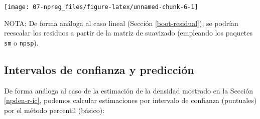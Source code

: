 \documentclass[
]{book}
\newenvironment{Shaded}{\begin{snugshade}}{\end{snugshade}}
\newcommand{\AttributeTok}[1]{\textcolor[rgb]{0.77,0.63,0.00}{#1}}
\newcommand{\DecValTok}[1]{\textcolor[rgb]{0.00,0.00,0.81}{#1}}
\newcommand{\FloatTok}[1]{\textcolor[rgb]{0.00,0.00,0.81}{#1}}
\newcommand{\FunctionTok}[1]{\textcolor[rgb]{0.00,0.00,0.00}{#1}}
\newcommand{\NormalTok}[1]{#1}
\newcommand{\OtherTok}[1]{\textcolor[rgb]{0.56,0.35,0.01}{#1}}
\newcommand{\SpecialCharTok}[1]{\textcolor[rgb]{0.00,0.00,0.00}{#1}}
\theoremstyle{break}
\theoremstyle{definition}
\theoremstyle{definition}
\theoremstyle{definition}
\theoremstyle{definition}
\theoremstyle{remark}
\begin{document}
\begin{center}\texttt{[image: 07-npreg\_files/figure-latex/unnamed-chunk-6-1]} \end{center}

NOTA: De forma análoga al caso lineal (Sección \ref{boot-residual}), se podrían reescalar los residuos a partir de la matriz de suavizado (empleando los paquetes \texttt{sm} o \texttt{npsp}).

\hypertarget{intervalos-de-confianza-y-predicciuxf3n}{%
\subsection{Intervalos de confianza y predicción}\label{intervalos-de-confianza-y-predicciuxf3n}}

De forma análoga al caso de la estimación de la densidad mostrado en la Sección \ref{npden-r-ic}, podemos calcular estimaciones por intervalo de confianza (puntuales) por el método percentil (básico):

\begin{Shaded}
\end{Shaded}
\end{document}
